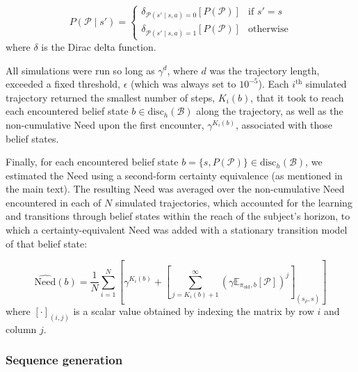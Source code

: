 \begin{equation*}
    P(\mathcal{P} \mid s') = \begin{cases}
    \delta_{\mathcal{P}(s'\mid s, a) = 0}\left[P(\mathcal{P})\right] & \text{if $s' = s$} \\
    \delta_{\mathcal{P}(s'\mid s, a) = 1}\left[P(\mathcal{P})\right] & \text{otherwise}
    \end{cases}
\end{equation*}
where $\delta$ is the Dirac delta function.

All simulations were run so long as $\gamma^{d}$, where $d$ was the trajectory length, exceeded a fixed threshold, $\epsilon$ (which was always set to $10^{-5}$). Each $i^\text{th}$ simulated trajectory returned the smallest number of steps, $K_i(b)$, that it took to reach each encountered belief state $b \in \text{disc}_h(\mathcal{B})$ along the trajectory, as well as the non-cumulative Need upon the first encounter, $\gamma^{K_i(b)}$, associated with those belief states. 

Finally, for each encountered belief state $b = \{s, P(\mathcal{P})\} \in \text{disc}_h(\mathcal{B})$, we estimated the Need using a second-form certainty equivalence (as mentioned in the main text). The resulting Need was averaged over the non-cumulative Need encountered in each of $N$ simulated trajectories, which accounted for the learning and transitions through belief states within the reach of the subject's horizon, to which a certainty-equivalent Need was added with a stationary transition model of that belief state:

\begin{equation}
    \widehat{\text{Need}}(b) = \frac{1}{N}\sum_{i=1}^N \left[ \gamma^{K_i(b)} + \left[\sum_{j=K_i(b)+1}^{\infty} \left(\gamma \mathbb{E}_{\pi_{\text{old}}, b}\left[\mathcal{P}\right]\right)^j\right]_{(s_\rho, s)} \right]
    \label{eqn:need_est}
\end{equation}
where $\left[ \cdot \right]_{(i, j)}$ is a scalar value obtained by indexing the matrix by row $i$ and column $j$.

\subsubsection*{Sequence generation}

